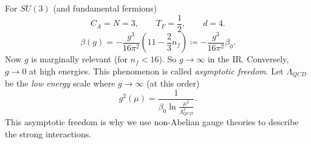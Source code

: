 For $SU(3)$ (and fundamental fermions)
\begin{equation}
  C_A = N = 3, \qquad T_F = \frac{1}{2}, \qquad d = 4.
\end{equation}
\begin{equation}
  \beta(g) = -\frac{g^3}{16 \pi^2} \left( 11 - \frac{2}{3} n_f \right) \coloneqq -\frac{g^3}{16 \pi^2} \beta_0.
\end{equation}
Now $g$ is marginally relevant (for $n_f < 16$). So $g \to \infty$ in the IR.
Conversely, $g \to 0$ at high energies. This phenomenon is called \emph{asymptotic freedom}.
Let $\Lambda_{QCD}$ be the \emph{low energy} scale where $g \to \infty$ (at this order)
\begin{equation}
  g^2(\mu) = \frac{1}{\beta_0 \ln \frac{\mu^2}{\Lambda_{QCD}^2}}.
\end{equation}
This asymptotic freedom is why we use non-Abelian gauge theories to describe the strong interactions.

